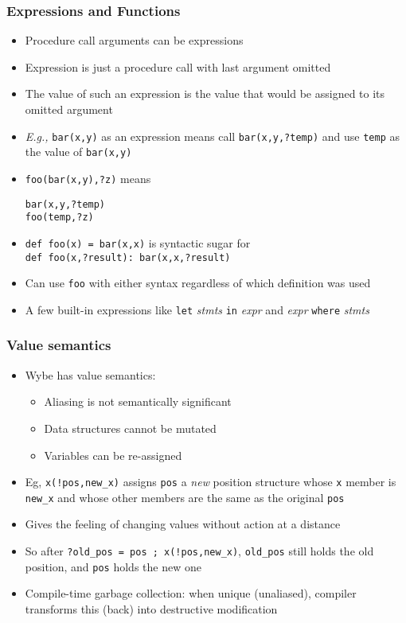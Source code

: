 \documentclass[12pt]{beamer}
\begin{document}
\begin{frame}[fragile]
\frametitle{Expressions and Functions}
\begin{itemize}
\item Procedure call arguments can be expressions
\item Expression is just a procedure call with last argument omitted
\item The value of such an expression is the value that would be assigned
  to its omitted argument
\item \emph{E.g.,} \texttt{bar(x,y)} as an expression means call
  \texttt{bar(x,y,?temp)} and use \texttt{temp} as the value of
  \texttt{bar(x,y)}
\item \texttt{foo(bar(x,y),?z)} \quad means \quad
  \begin{minipage}[c]{0.4\linewidth}
  \texttt{bar(x,y,?temp)} \\
  \texttt{foo(temp,?z)}
  \end{minipage}
\item \texttt{def foo(x) = bar(x,x)} is syntactic sugar for \\
\texttt{def foo(x,?result): bar(x,x,?result)}
\item Can use \texttt{foo} with either syntax regardless of which
  definition was used
\item A few built-in expressions like \texttt{let} \emph{stmts}
  \texttt{in} \emph{expr} and \emph{expr} \texttt{where} \emph{stmts}
\end{itemize}
\end{frame}


\begin{frame}[fragile]
\frametitle{Value semantics}
\begin{itemize}
\item Wybe has value semantics:
  \begin{itemize}
  \item Aliasing is not semantically significant
  \item Data structures cannot be mutated
  \item Variables can be re-assigned
  \end{itemize}
\item Eg, \texttt{x(!pos,new\_x)} assigns \texttt{pos}
  a \emph{new} position structure whose \texttt{x} member is \texttt{new\_x} and
  whose other members are the same as the original \texttt{pos}
\item Gives the feeling of changing values without action at a distance
\item So after \texttt{?old\_pos = pos ; x(!pos,new\_x)}, \texttt{old\_pos}
  still holds the old position, and \texttt{pos} holds the new one
\item Compile-time garbage collection:  when unique (unaliased),
  compiler transforms this (back) into destructive modification
\end{itemize}
\end{frame}
\end{document}
